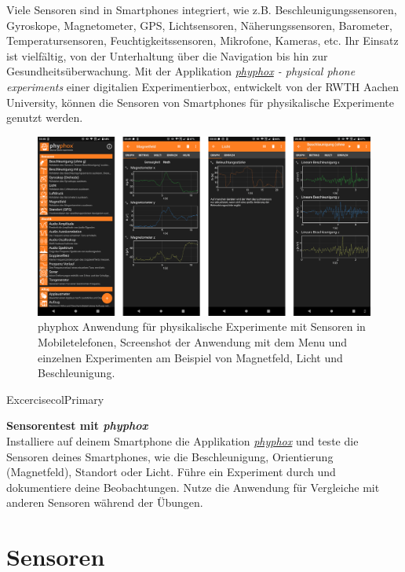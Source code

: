\documentclass[
  11pt,
  a4paper,
  oneside, openany  ,captions=tableheading
]{scrbook}
\theoremstyle{remark}
\begin{document}
Viele Sensoren sind in Smartphones integriert, wie z.B.
Beschleunigungssensoren, Gyroskope, Magnetometer, GPS, Lichtsensoren,
Näherungssensoren, Barometer, Temperatursensoren, Feuchtigkeitssensoren,
Mikrofone, Kameras, etc. Ihr Einsatz ist vielfältig, von der
Unterhaltung über die Navigation bis hin zur Gesundheitsüberwachung. Mit
der Applikation \emph{\href{https://phyphox.org}{phyphox}
- physical phone experiments} einer digitalien Experimentierbox,
entwickelt von der RWTH Aachen University, können die Sensoren von
Smartphones für physikalische Experimente genutzt werden.

\begin{figure}[H]

{\centering \includegraphics{images/phyphox.png}

}

\caption{phyphox Anwendung für physikalische Experimente mit Sensoren in
Mobiletelefonen, Screenshot der Anwendung mit dem Menu und einzelnen
Experimenten am Beispiel von Magnetfeld, Licht und Beschleunigung.}

\end{figure}%

\begin{boxtitle}{Excercise}{colPrimary}

\textbf{Sensorentest mit \emph{phyphox}}\\
Installiere auf deinem Smartphone die Applikation
\emph{\href{https://phyphox.org}{phyphox}} und teste die Sensoren deines
Smartphones, wie die Beschleunigung, Orientierung (Magnetfeld), Standort
oder Licht. Führe ein Experiment durch und dokumentiere deine
Beobachtungen. Nutze die Anwendung für Vergleiche mit anderen Sensoren
während der Übungen.

\end{boxtitle}

\section{Sensoren}\label{sensoren-1}
\end{document}
